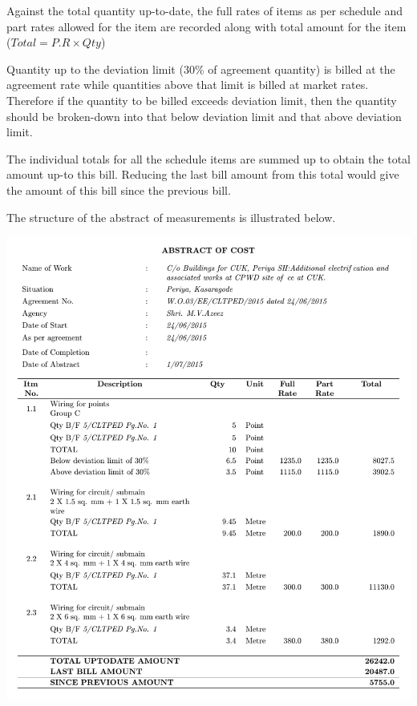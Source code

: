 \documentclass[twoside,a4paper]{refart}
\newenvironment{fminipage}[1]%
{\begin{Sbox}\begin{minipage}{#1}\begin{center}}%
		{\end{center}\end{minipage}\end{Sbox}\shadowbox{\TheSbox}}
\newenvironment{noteblock}[1]%
{\begin{mdframed}[topline=false,bottomline=false, rightline=false,
		linewidth=2pt, frametitle={#1}]}%
		{\end{mdframed}}
\begin{document}
	 Against the total quantity up-to-date, the full rates of items as per schedule and part rates allowed for the item are recorded along with total amount for the item ($Total = P.R \times Qty$)\\
	 
	 \begin{noteblock}{Note:}
	 	Quantity up to the deviation limit (30\% of agreement quantity) is billed at the agreement rate while quantities above that limit is billed at market rates. Therefore if the quantity to be billed exceeds deviation limit, then the quantity should be broken-down into that below deviation limit and that above deviation limit.
	 \end{noteblock}
	 
	 The individual totals for all the schedule items are summed up to obtain the total amount up-to this bill. Reducing the last bill amount from this total would give the amount of this bill since the previous bill.
	 
	 The structure of the abstract of measurements is illustrated below.
	 
	 \begin{center}
	 	\begin{fminipage}{\textwidth}
	 		\includegraphics[width=1\linewidth]{figures/abstract.pdf}
	 	\end{fminipage}
	 \end{center}
	 
\end{document}
